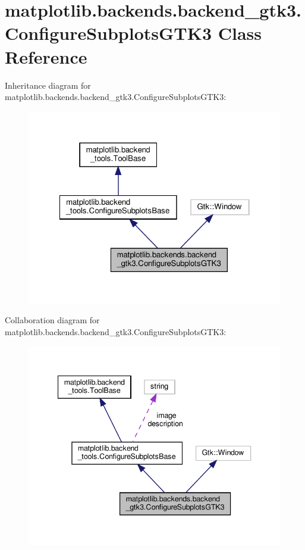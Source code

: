 \hypertarget{classmatplotlib_1_1backends_1_1backend__gtk3_1_1ConfigureSubplotsGTK3}{}\section{matplotlib.\+backends.\+backend\+\_\+gtk3.\+Configure\+Subplots\+G\+T\+K3 Class Reference}
\label{classmatplotlib_1_1backends_1_1backend__gtk3_1_1ConfigureSubplotsGTK3}


Inheritance diagram for matplotlib.\+backends.\+backend\+\_\+gtk3.\+Configure\+Subplots\+G\+T\+K3\+:
\nopagebreak
\begin{figure}[H]
\begin{center}
\leavevmode
\includegraphics[width=322pt]{classmatplotlib_1_1backends_1_1backend__gtk3_1_1ConfigureSubplotsGTK3__inherit__graph}
\end{center}
\end{figure}


Collaboration diagram for matplotlib.\+backends.\+backend\+\_\+gtk3.\+Configure\+Subplots\+G\+T\+K3\+:
\nopagebreak
\begin{figure}[H]
\begin{center}
\leavevmode
\includegraphics[width=340pt]{classmatplotlib_1_1backends_1_1backend__gtk3_1_1ConfigureSubplotsGTK3__coll__graph}
\end{center}
\end{figure}
